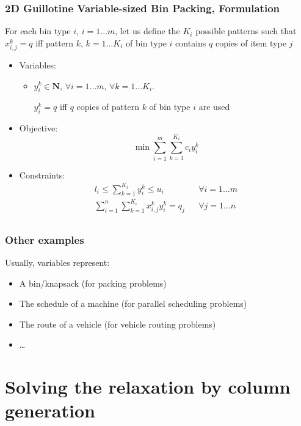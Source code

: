 \documentclass[10pt]{beamer}
\newcommand{\N}{\mathbf{N}}
\begin{document}
\begin{frame}
  \frametitle{2D Guillotine Variable-sized Bin Packing, Formulation}

  For each bin type $i$, $i = 1 \dots m$, let us define the $K_i$ possible patterns such that $x_{i, j}^k = q$ iff pattern $k$, $k = 1 \dots K_i$ of bin type $i$ contains $q$ copies of item type $j$

  \begin{itemize}
    \item Variables:
      \begin{itemize}
        \item $y_i^k \in \N$,
          $\forall i = 1 \dots m$, $\forall k = 1 \dots K_i$.

          $y_i^k = q$ iff $q$ copies of pattern $k$ of bin type $i$ are used
      \end{itemize}

    \item Objective:
      \begin{displaymath}
        \min \sum_{i = 1}^m \sum_{k = 1}^{K_i} c_i y_i^k
      \end{displaymath}

    \item Constraints:
      \begin{align*}
        l_i \le \sum_{k = 1}^{K_i} y_i^k \le u_i && \forall i = 1 \dots m \\
        \sum_{i = 1}^n \sum_{k = 1}^{K_i} x_{i, j}^k y_i^k = q_j && \forall j = 1 \dots n \\
      \end{align*}
  \end{itemize}
\end{frame}

\begin{frame}
  \frametitle{Other examples}

  Usually, variables represent:
  \begin{itemize}
    \item A bin/knapsack (for packing problems)
    \item The schedule of a machine (for parallel scheduling problems)
    \item The route of a vehicle (for vehicle routing problems)
    \item \dots
  \end{itemize}
\end{frame}

\section{Solving the relaxation by column generation}
\end{document}
